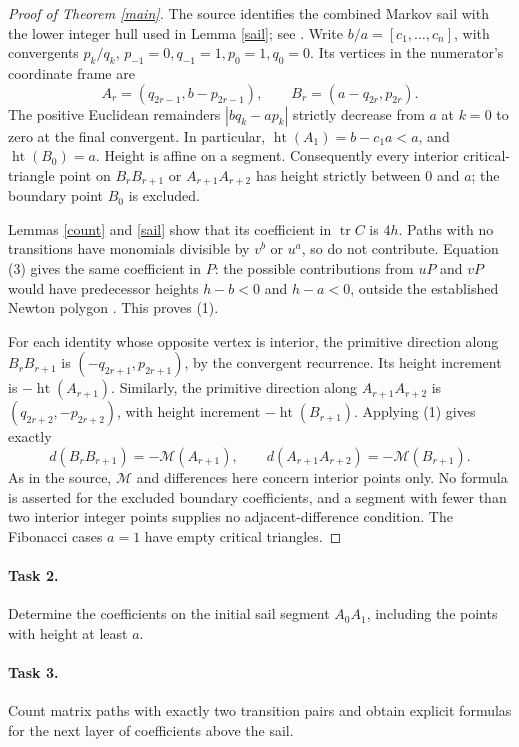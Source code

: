 \documentclass[11pt]{article}
\newcommand{\tr}{\operatorname{tr}}
\newcommand{\HH}{\operatorname{ht}}
\begin{document}
\begin{proof}[Proof of Theorem \ref{main}]
The source identifies the combined Markov sail with the lower
integer hull used in Lemma \ref{sail}; see \cite[pages 20--21]{EVW}.
Write $b/a=[c_1,\ldots,c_n]$, with convergents $p_k/q_k$,
$p_{-1}=0,q_{-1}=1,p_0=1,q_0=0$. Its vertices in the
numerator's coordinate frame are
\[
 A_r=(q_{2r-1},b-p_{2r-1}),\qquad
 B_r=(a-q_{2r},p_{2r}).
 \tag{9}
\]
The positive Euclidean remainders $|bq_k-ap_k|$ strictly decrease
from $a$ at $k=0$ to zero at the final convergent. In particular,
$\HH(A_1)=b-c_1a<a$, and $\HH(B_0)=a$.
Height is affine on a segment. Consequently every interior
critical-triangle point on $B_rB_{r+1}$ or $A_{r+1}A_{r+2}$ has
height strictly between $0$ and $a$; the boundary point $B_0$
is excluded.

Lemmas \ref{count} and \ref{sail} show that its coefficient in
$\tr C$ is $4h$. Paths with no transitions have monomials
divisible by $v^b$ or $u^a$, so do not contribute.
Equation (3) gives the same coefficient in $P$: the possible
contributions from $uP$ and $vP$ would have predecessor heights
$h-b<0$ and $h-a<0$, outside the established Newton polygon
\cite[Theorem 3.2]{EVW}. This proves (1).

For each identity whose opposite vertex is interior, the primitive
direction along $B_rB_{r+1}$ is
$(-q_{2r+1},p_{2r+1})$, by the convergent recurrence. Its height
increment is $-\HH(A_{r+1})$. Similarly, the primitive direction
along $A_{r+1}A_{r+2}$ is $(q_{2r+2},-p_{2r+2})$, with height
increment $-\HH(B_{r+1})$. Applying (1) gives exactly
\[
 d(B_rB_{r+1})=-\mathcal M(A_{r+1}),\qquad
 d(A_{r+1}A_{r+2})=-\mathcal M(B_{r+1}).
\]
As in the source, $\mathcal M$ and differences here concern
interior points only. No formula is asserted for the excluded
boundary coefficients, and a segment with fewer than two interior
integer points supplies no adjacent-difference condition.
The Fibonacci cases $a=1$ have empty critical triangles.
\end{proof}

\paragraph{Task 2.}
Determine the coefficients on the initial sail segment $A_0A_1$,
including the points with height at least $a$.

\paragraph{Task 3.}
Count matrix paths with exactly two transition pairs and obtain
explicit formulas for the next layer of coefficients above the sail.
\end{document}
